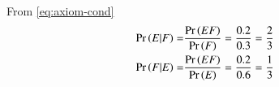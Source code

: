 \solution
From \eqref{eq:axiom-cond}
\begin{align}
\Pr\left(E|F\right)=&\frac{\Pr\left(E  F\right)}{\Pr\left(F\right)}=\frac{0.2}{0.3}=\frac{2}{3}&  
\\
\Pr\left(F|E\right)=&\frac{\Pr\left(E  F\right)}{\Pr\left(E\right)}=\frac{0.2}{0.6}=\frac{1}{3}&  
\end{align}

